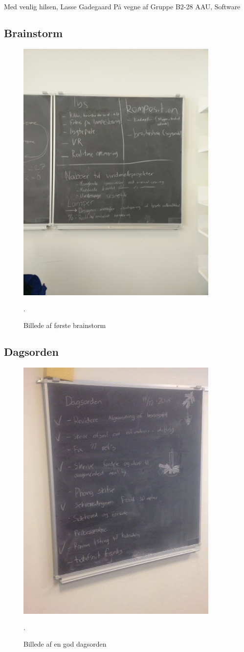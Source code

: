 \documentclass[oneside,a4paper,titlepage]{article}
\begin{document}
Med venlig hilsen,\newline
Lasse Gadegaard\newline
På vegne af\newline
Gruppe B2-28\newline
AAU, Software

\subsection{Brainstorm}
\begin{figure}[H]
   \centering
   \includegraphics[width=10cm]{graphics/brainstorm_1}
   \caption{Billede af første brainstorm}.
\end{figure}

\subsection{Dagsorden}
\begin{figure}[H]
   \centering
   \includegraphics[width=10cm]{graphics/dagsorden}
   \caption{Billede af en god dagsorden}.
   \label{fig:dagsorden}
\end{figure}
\end{document}

